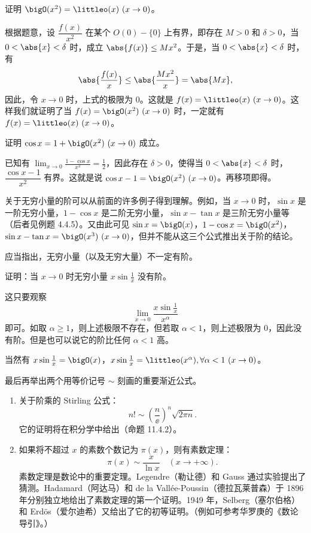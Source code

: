 \begin{xexample}[4.4.1]
证明 $\bigO(x^2)=\littleo(x)\ (x\to0)$。
\end{xexample}
\begin{xproof}
根据题意，设 $\dfrac{f(x)}{x^2}$ 在某个 $O(0)-\{0\}$ 上有界，即存在 $M>0$ 和 $\delta>0$，当 $0<\abs{x}<\delta$ 时，成立 $\abs{f(x)}\leq Mx^2$。于是，当 $0<\abs{x}<\delta$ 时，有
\[
  \abs{\frac{f(x)}x}\leq\abs{\frac{Mx^2}x}=\abs{Mx},
\]
因此，令 $x\to0$ 时，上式的极限为 0。这就是 $f(x)=\littleo(x)\ (x\to0)$。这样我们就证明了当 $f(x)=\bigO(x^2)\ (x\to0)$ 时，一定就有 $f(x)=\littleo(x)\ (x\to0)$。
\end{xproof}

\begin{xexample}[4.4.2]
证明 $\cos x=1+\bigO(x^2)\ (x\to0)$ 成立。
\end{xexample}
\begin{xproof}
已知有 $\displaystyle\lim_{x\to0}\frac{1-\cos x}{x^2}=\frac12$，因此存在 $\delta>0$，使得当 $0<\abs{x}<\delta$ 时，$\dfrac{\cos x-1}{x^2}$ 有界。这就是说 $\cos x-1=\bigO(x^2)\ (x\to0)$。再移项即得。
\end{xproof}

关于无穷小量的阶可以从前面的许多例子得到理解。例如，当 $x\to0$ 时，$\sin x$ 是一阶无穷小量，$1-\cos x$ 是二阶无穷小量，$\sin x-\tan x$ 是三阶无穷小量等（后者见例题 4.4.5）。又由此可见 $\sin x=\bigO(x)$，$1-\cos x=\bigO(x^2)$，$\sin x-\tan x=\bigO(x^3)\ (x\to0)$，但并不能从这三个公式推出关于阶的结论。

应当指出，无穷小量（以及无穷大量）不一定有阶。

\begin{xexample}[4.4.3]
证明：当 $x\to0$ 时无穷小量 $x\sin\frac1x$ 没有阶。
\end{xexample}
\begin{xproof}
这只要观察
\[
  \lim_{x\to0}\frac{x\sin\frac1x}{x^\alpha}
\]
即可。如取 $\alpha\geq1$，则上述极限不存在，但若取 $\alpha<1$，则上述极限为 0，因此没有阶。但是也可以说它的阶比任何 $\alpha<1$ 高。
\end{xproof}

当然有 $x\sin\frac1x=\bigO(x)$，$x\sin\frac1x=\littleo(x^\alpha),\forall\alpha<1\ (x\to0)$。

最后再举出两个用等价记号 $\sim$ 刻画的重要渐近公式。

\begin{enumerate}
  \item 关于阶乘的 Stirling 公式：
  \[
    n!\sim\left(\frac n\ee\right)^n\sqrt{2\pi n}.
  \]
  它的证明将在积分学中给出（命题 11.4.2）。
  \item 如果将不超过 $x$ 的素数个数记为 $\pi(x)$，则有素数定理：
  \[
    \pi(x)\sim\frac{x}{\ln x}\quad(x\to+\infty).
  \]
  素数定理是数论中的重要定理。Legendre（勒让德）和 Gauss 通过实验提出了猜测。Hadamard（阿达马）和 de la Vallée-Poussin（德拉瓦莱普森）于 1896 年分别独立地给出了素数定理的第一个证明。1949 年，Selberg（塞尔伯格）和 Erdös（爱尔迪希）又给出了它的初等证明。（例如可参考华罗庚的《数论导引》。）
\end{enumerate}

